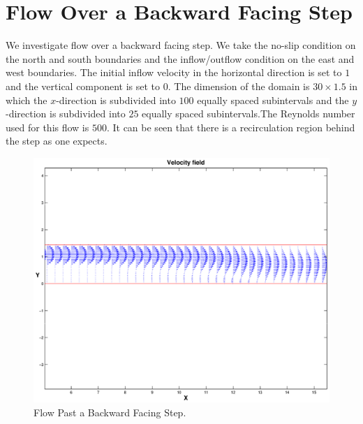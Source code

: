 \section{Flow Over a Backward Facing Step}

We investigate flow over a backward facing step. We take the no-slip condition on the north and south boundaries and the inflow/outflow condition on the east and west boundaries. The initial inflow velocity in the horizontal direction is set to $1$ and the vertical component is set to $0$. The dimension of the domain is $30\times1.5$ in which the $x$-direction is subdivided into $100$ equally spaced subintervals and the $y$-direction is subdivided into $25$ equally spaced subintervals.The Reynolds number used for this flow is $500$. It can be seen that there is a recirculation region behind the step as one expects. 

\begin{figure}
\begin{center}
\includegraphics[scale=.3]{backstep_velocityfield.eps}
\end{center}
\caption{Flow Past a Backward Facing Step.}
\label{bwfs1}
\end{figure}

